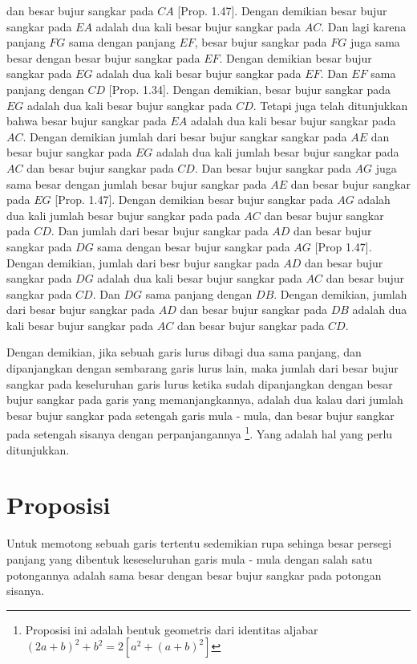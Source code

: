 \documentclass[a4paper]{book}
\begin{document}
dan besar bujur sangkar pada $CA$ [Prop. 1.47]. Dengan demikian besar bujur
sangkar pada $EA$ adalah dua kali besar bujur sangkar pada $AC$. Dan lagi 
karena panjang $FG$ sama dengan panjang $EF$, besar bujur sangkar pada $FG$
juga sama besar dengan besar bujur sangkar pada $EF$. Dengan demikian besar
bujur sangkar pada $EG$ adalah dua kali besar bujur sangkar pada $EF$. Dan 
$EF$ sama panjang dengan $CD$ [Prop. 1.34]. Dengan demikian, besar bujur 
sangkar pada $EG$ adalah dua kali besar bujur sangkar pada $CD$. Tetapi juga
telah ditunjukkan bahwa besar bujur sangkar pada $EA$ adalah dua kali besar
bujur sangkar pada $AC$. Dengan demikian jumlah dari besar bujur sangkar
sangkar pada $AE$ dan besar bujur sangkar pada $EG$   adalah dua kali 
jumlah besar bujur sangkar pada $AC$ dan besar bujur sangkar pada $CD$. Dan 
besar bujur sangkar pada $AG$ juga sama besar dengan jumlah besar bujur 
sangkar pada $AE$ dan besar bujur sangkar pada $EG$ [Prop. 1.47]. Dengan 
demikian besar bujur sangkar pada $AG$ adalah dua kali jumlah besar bujur
sangkar pada pada $AC$ dan besar bujur sangkar pada $CD$. Dan jumlah dari
besar bujur sangkar pada $AD$ dan besar bujur sangkar pada $DG$ sama dengan 
besar bujur sangkar pada $AG$ [Prop 1.47]. Dengan demikian, jumlah dari besr
bujur sangkar pada $AD$ dan besar bujur sangkar pada $DG$ adalah dua kali 
besar bujur sangkar pada $AC$ dan besar bujur sangkar pada $CD$. Dan $DG$
sama panjang dengan $DB$. Dengan demikian, jumlah dari besar bujur sangkar
pada $AD$ dan besar bujur sangkar pada $DB$ adalah dua kali besar bujur 
sangkar pada $AC$ dan besar bujur sangkar pada $CD$.

Dengan demikian, jika sebuah garis lurus dibagi dua sama panjang, 
dan dipanjangkan dengan sembarang garis lurus lain, maka jumlah dari besar 
bujur sangkar pada keseluruhan garis lurus ketika sudah dipanjangkan dengan 
besar bujur sangkar pada garis yang memanjangkannya, 
adalah dua kalau dari jumlah besar bujur sangkar pada setengah garis 
mula - mula, dan besar bujur sangkar pada setengah sisanya dengan 
perpanjangannya \footnote{Proposisi ini adalah bentuk geometris dari identitas
aljabar $(2a + b)^2 + b^2 = 2[a^2 + (a + b)^2]$}. 
Yang adalah hal yang perlu ditunjukkan.

\section*{\centering Proposisi \thesection} 
Untuk memotong sebuah garis tertentu sedemikian rupa sehinga besar persegi 
panjang yang dibentuk keseseluruhan garis mula - mula dengan salah satu
potongannya adalah sama besar dengan besar bujur sangkar pada potongan sisanya.
\end{document}
